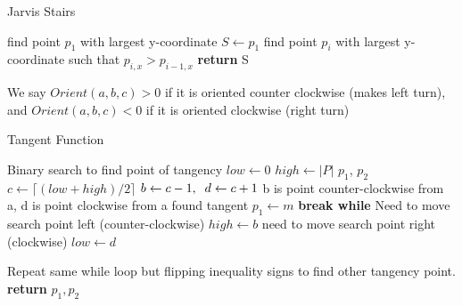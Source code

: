 \documentclass[11pt]{article}
\begin{document}
\begin{enumerate}[1. ]
    \begin{algorithm}
        \caption{Jarvis Stairs}\label{guests}
        \begin{algorithmic}[1]
            \State find point $p_1$ with largest y-coordinate
            \State $S \gets p_1$
                \State find point $p_i$ with largest y-coordinate such that $p_{i,x} > p_{i-1,x}$
            \EndFor
            \State \textbf{return} S
        \EndFunction
        \end{algorithmic}
    \end{algorithm}

\end{enumerate}






We say $Orient(a,b,c) > 0$ if it is oriented counter clockwise (makes left turn), and $Orient(a,b,c) < 0$ if it is oriented clockwise (right turn)

\begin{algorithm}
    \caption{Tangent Function}\label{guests}
    \label{alg:prob1}
    \begin{algorithmic}[1]
        \State Binary search to find point of tangency
        \State $low \gets 0$
        \State $high \gets |P|$
        \State $p_1$, $p_2$
            \State $c \gets \lceil (low + high)/2 \rceil$
            \State $b \gets c-1, \sp d \gets c + 1$ \quad b is point counter-clockwise from a, d is point clockwise from a
                \State found tangent
                \State $p_1 \gets m$
                \State \textbf{break while}
                \State Need to move search point left (counter-clockwise)
                \State $high \gets b$
                \State need to move search point right (clockwise)
                \State $low \gets d$
            \EndIf
        \EndWhile

        \State Repeat same while loop but flipping inequality signs to find other tangency point.
        \State \textbf{return} $p_1, p_2$
    \EndFunction
    \end{algorithmic}
\end{algorithm}
\end{document}
